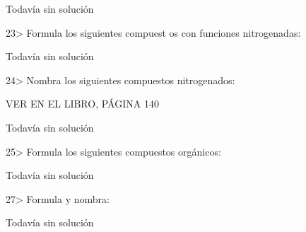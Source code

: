 \documentclass{article}
\begin{document}
\begin{solution}[print=false]
  Todavía sin solución
\end{solution}

\begin{exercise}
  23> Formula los siguientes compuest os con funciones nitrogenadas:
\end{exercise}

\begin{solution}[print=false]
  Todavía sin solución
\end{solution}

\begin{exercise}
  24> Nombra los siguientes compuestos nitrogenados:

  VER EN EL LIBRO, PÁGINA 140
\end{exercise}

\begin{solution}[print=false]
  Todavía sin solución
\end{solution}

\begin{exercise}
  25> Formula los siguientes compuestos orgánicos:
\end{exercise}

\begin{solution}[print=false]
  Todavía sin solución
\end{solution}

\begin{exercise}
  27> Formula y nombra:
\end{exercise}

\begin{solution}[print=false]
  Todavía sin solución
\end{solution}
\end{document}
